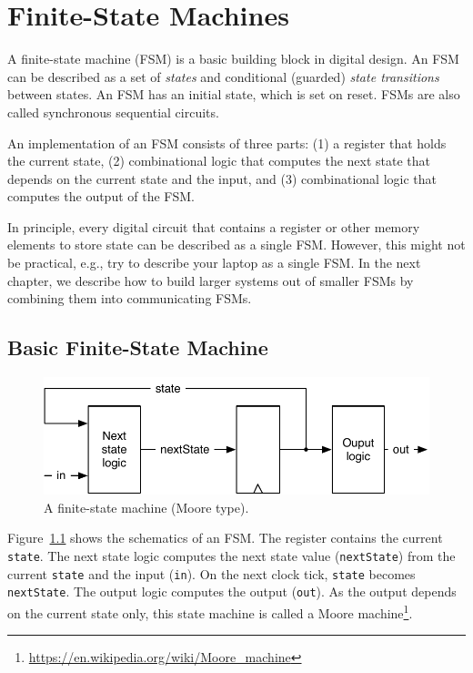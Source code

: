 \documentclass[%
    10pt,
    headinclude, footexclude,
    openright, %
    notitlepage,
    cleardoubleempty,
    headsepline,
    pointlessnumbers,
    bibtotoc, idxtotoc,
    ]{scrbook}
\newcommand{\code}[1]{{\small{\texttt{#1}}}}
\newcommand{\scale}{0.7}
\newcommand{\myref}[2]{\href{#1}{#2}}
\renewcommand{\myref}[2]{{#2}{\footnote{\url{#1}}}}
\begin{document}
\chapter{Finite-State Machines}

A finite-state machine (FSM) is a basic building block in digital design.
An FSM can be described as a set of \emph{states} and conditional (guarded)
\emph{state transitions} between states. 
An FSM has an initial state, which is set on reset.
FSMs are also called synchronous sequential circuits.

An implementation of an FSM consists of three parts: (1) a register that holds the current state,
(2) combinational logic that computes the next state that depends on the current
state and the input, and (3) combinational logic that computes the output of the FSM.

In principle, every digital circuit that contains a register or other memory elements
to store state can be described as a single FSM. However, this might
not be practical, e.g., try to describe your laptop as a single FSM.
In the next chapter, we describe how to build larger systems
out of smaller FSMs by combining them into communicating FSMs.

\section{Basic Finite-State Machine}

\begin{figure}
  \centering
  \includegraphics[scale=\scale]{figures/fsm}
  \caption{A finite-state machine (Moore type).}
  \label{fig:fsm}
\end{figure}

Figure~\ref{fig:fsm} shows the schematics of an FSM. The register contains the current \code{state}.
The next state logic computes the next state value (\code{nextState})
from the current \code{state} and the input (\code{in}).
On the next clock tick, \code{state} becomes \code{nextState}.
The output logic computes the output (\code{out}). As the output depends on the current
state only, this state machine is called a
\myref{https://en.wikipedia.org/wiki/Moore_machine}{Moore machine}.
\end{document}
